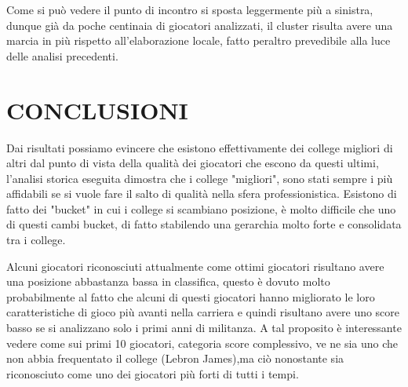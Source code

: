 \documentclass[10.5pt,a4paper,twocolumn]{article}
\begin{document}

Come si può vedere il punto di incontro si sposta leggermente più a sinistra, dunque già da poche centinaia di giocatori analizzati, il cluster risulta avere una marcia in più rispetto all'elaborazione locale, fatto peraltro prevedibile alla luce delle analisi precedenti.

\section{CONCLUSIONI}

Dai risultati possiamo evincere che esistono effettivamente dei college migliori di altri dal punto di vista della qualità dei giocatori che escono da questi ultimi, l'analisi storica eseguita dimostra che i college "migliori", sono stati sempre i più affidabili se si vuole fare il salto di qualità nella sfera professionistica. Esistono di fatto dei "bucket" in cui i college si scambiano posizione, è molto difficile che uno di questi cambi bucket, di fatto stabilendo una gerarchia molto forte e consolidata tra i college.

Alcuni giocatori riconosciuti attualmente come ottimi giocatori risultano avere una posizione abbastanza bassa in classifica, questo è dovuto molto probabilmente al fatto che alcuni di questi giocatori hanno migliorato le loro caratteristiche di gioco più avanti nella carriera e quindi risultano avere uno score basso se si analizzano solo i primi anni di militanza. A tal proposito è interessante vedere come sui primi 10 giocatori, categoria score complessivo, ve ne sia uno che non abbia frequentato il college (Lebron James),ma ciò nonostante sia riconosciuto come uno dei giocatori più forti di tutti i tempi.
\end{document}
